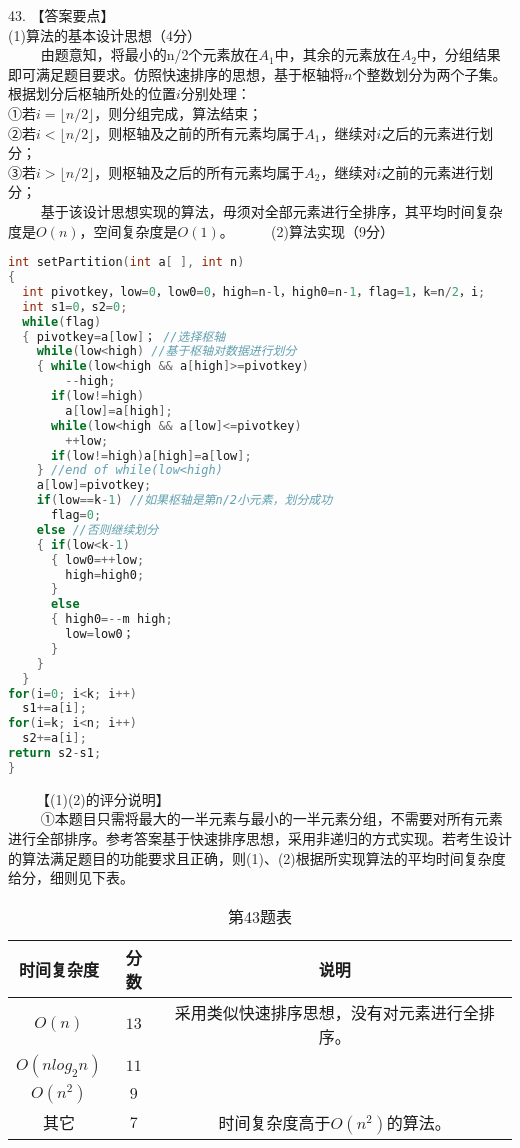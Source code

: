 43. 【答案要点】 \\
(1)算法的基本设计思想（4分） \\
$\qquad$ 由题意知，将最小的n/2个元素放在$A_1$中，其余的元素放在$A_2$中，分组结果即可满足题目要求。仿照快速排序的思想，基于枢轴将$n$个整数划分为两个子集。根据划分后枢轴所处的位置$i$分别处理： \\
①若$i= \lfloor n/2 \rfloor$，则分组完成，算法结束； \\
②若$i< \lfloor n/2 \rfloor $，则枢轴及之前的所有元素均属于$A_1$，继续对$i$之后的元素进行划分； \\
③若$i> \lfloor n/2 \rfloor$，则枢轴及之后的所有元素均属于$A_2$，继续对$i$之前的元素进行划分； \\
$\qquad$ 基于该设计思想实现的算法，毋须对全部元素进行全排序，其平均时间复杂度是$O(n)$，空间复杂度是$O(1)$。
$\qquad$ (2)算法实现（9分） \\
\begin{lstlisting}[language=cpp]
int setPartition(int a[ ], int n)
{ 
  int pivotkey，low=0，low0=0，high=n-l，high0=n-1，flag=1，k=n/2，i;
  int s1=0，s2=0;
  while(flag)
  { pivotkey=a[low]； //选择枢轴
    while(low<high) //基于枢轴对数据进行划分
    { while(low<high && a[high]>=pivotkey)
        --high;
      if(low!=high)
        a[low]=a[high];
      while(low<high && a[low]<=pivotkey)
        ++low;
      if(low!=high)a[high]=a[low];
    } //end of while(low<high)
    a[low]=pivotkey;
    if(low==k-1) //如果枢轴是第n/2小元素，划分成功
      flag=0;
    else //否则继续划分
    { if(low<k-1)
      { low0=++low;
        high=high0;
      }
      else
      { high0=--m high;
        low=low0；
      }
    }
  }
for(i=0; i<k; i++)
  s1+=a[i];
for(i=k; i<n; i++)
  s2+=a[i];
return s2-s1;
}
\end{lstlisting}
$\qquad$【(1)(2)的评分说明】 \\
$\qquad$ ①本题目只需将最大的一半元素与最小的一半元素分组，不需要对所有元素进行全部排序。参考答案基于快速排序思想，采用非递归的方式实现。若考生设计的算法满足题目的功能要求且正确，则(1)、(2)根据所实现算法的平均时间复杂度给分，细则见下表。
\begin{table}[ht]
\centering
\caption{第43题表}\label{tab_CSN16_5}
\begin{tabular}{|c|c|c|}
\hline
时间复杂度 & 分数 & 说明 \\
\hline
$O(n)$ & $13$ & 采用类似快速排序思想，没有对元素进行全排序。 \\
\hline
$O(nlog_2n)$ & $11$ &  \\
\hline
$O(n^2)$ & $9$ &  \\
\hline
其它 & $7$ & 时间复杂度高于$O(n^2)$的算法。 \\
\hline
\end{tabular}
\end{table}
